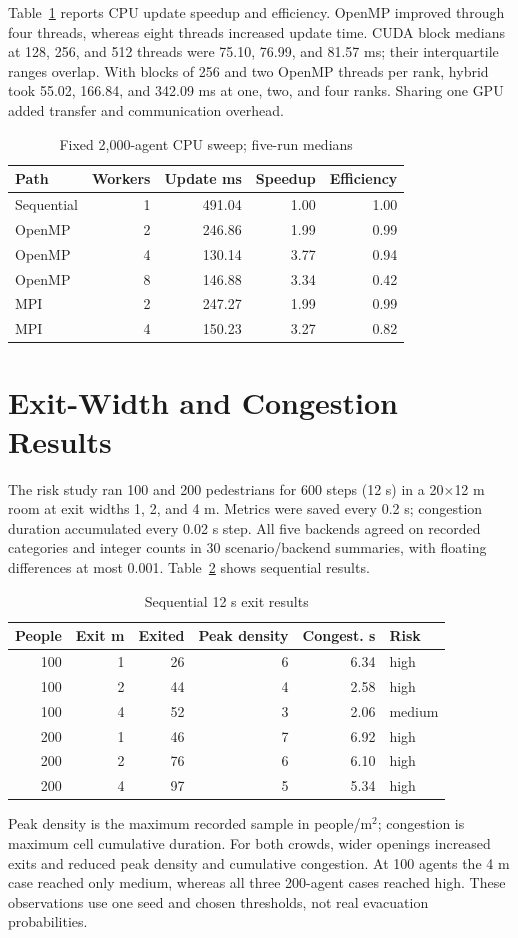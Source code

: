 \documentclass[conference]{IEEEtran}
\begin{document}
Table~\ref{tab:cpu} reports CPU update speedup and efficiency. OpenMP improved through four threads, whereas eight threads increased update time. CUDA block medians at 128, 256, and 512 threads were 75.10, 76.99, and 81.57 ms; their interquartile ranges overlap. With blocks of 256 and two OpenMP threads per rank, hybrid took 55.02, 166.84, and 342.09 ms at one, two, and four ranks. Sharing one GPU added transfer and communication overhead.
\begin{table}[t]\caption{Fixed 2,000-agent CPU sweep; five-run medians}\label{tab:cpu}\centering\footnotesize
\begin{tabular}{lrrrr}\toprule Path&Workers&Update ms&Speedup&Efficiency\\\midrule
Sequential&1&491.04&1.00&1.00\\OpenMP&2&246.86&1.99&0.99\\OpenMP&4&130.14&3.77&0.94\\OpenMP&8&146.88&3.34&0.42\\MPI&2&247.27&1.99&0.99\\MPI&4&150.23&3.27&0.82\\\bottomrule\end{tabular}\end{table}

\section{Exit-Width and Congestion Results}
The risk study ran 100 and 200 pedestrians for 600 steps (12 s) in a 20$\times$12 m room at exit widths 1, 2, and 4 m. Metrics were saved every 0.2 s; congestion duration accumulated every 0.02 s step. All five backends agreed on recorded categories and integer counts in 30 scenario/backend summaries, with floating differences at most 0.001. Table~\ref{tab:risk} shows sequential results.
\begin{table}[t]\caption{Sequential 12 s exit results}\label{tab:risk}\centering\footnotesize
\begin{tabular}{rrrrrl}\toprule People&Exit m&Exited&Peak density&Congest. s&Risk\\\midrule
100&1&26&6&6.34&high\\100&2&44&4&2.58&high\\100&4&52&3&2.06&medium\\
200&1&46&7&6.92&high\\200&2&76&6&6.10&high\\200&4&97&5&5.34&high\\\bottomrule\end{tabular}\end{table}
Peak density is the maximum recorded sample in people/m$^2$; congestion is maximum cell cumulative duration. For both crowds, wider openings increased exits and reduced peak density and cumulative congestion. At 100 agents the 4 m case reached only medium, whereas all three 200-agent cases reached high. These observations use one seed and chosen thresholds, not real evacuation probabilities.
\end{document}
